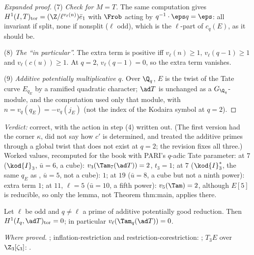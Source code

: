 \begin{sloppypar}
\begin{proof}[Expanded proof]
(7) \emph{Check for $M=T$.} The same computation gives $H^1(I,T)_{\mathrm{tor}}=(\Z/\ell^{v_\ell(n)})\bar e_1$ with $\Frob$ acting by $q^{-1}\cdot\eps q=\eps$: all invariant if split, none if nonsplit
($\ell$ odd), which is the $\ell$-part of $c_q(E)$, as it should be.

(8) \emph{The ``in particular''.} The extra term is positive iff $v_\ell(n)\ge1$, $v_\ell(q-1)\ge1$ and $v_\ell(c(u))\ge1$. At $q=2$, $v_\ell(q-1)=0$, so the extra term vanishes.

(9) \emph{Additive potentially multiplicative $q$.} Over $\Q_q$, $E$ is the twist of the Tate curve $E_{q_E}$ by a ramified quadratic character; $\ad T$ is unchanged as a $G_{\Q_q}$-module, and the
computation used only that module, with $n=v_q(q_E)=-v_q(j_E)$ (not the index of the Kodaira symbol at $q=2$).
\end{proof}

\noindent\emph{Verdict:} correct, with the action in step (4) written out. (The first version had the corner $\kappa$, did not say how $c'$ is determined, and treated the
additive primes through a global twist that does not exist at $q=2$; the revision fixes all three.) Worked values, recomputed for the book with PARI's $q$-adic
Tate parameter:  at $7$ ($\kod{I}_3$, $\bar u=6$, a cube): $v_3(\Tam_7(\ad T))=2$, $t_3=1$;  at $7$ ($\kod{I}_3^*$, the same $q_E$ as , $\bar u=5$, not a
cube): $1$;  at $19$ ($\bar u=8$, a cube but not a ninth power): extra term $1$;  at $11$, $\ell=5$ ($\bar u=10$, a fifth power): $v_5(\Tam)=2$, although $E[5]$ is
reducible, so only the lemma, not Theorem thm:main, applies there.

\begin{lemma}\label{lem:paper:tamadd}
Let $\ell$ be odd and $q\ne\ell$ a prime of additive potentially good reduction. Then $H^1(I_q,\ad T)_{\mathrm{tor}}=0$; in particular $v_\ell(\Tam_q(\ad T))=0$.
\end{lemma}

\noindent\emph{Where proved.} ; inflation-restriction and restriction-corestriction: ; $T_3E$ over $\Z_3[\zeta_3]$: .


\end{sloppypar}
